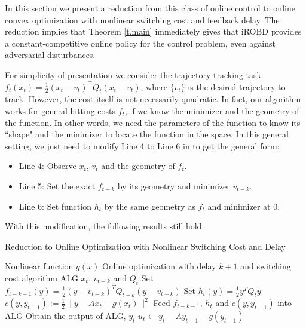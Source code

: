 In this section we present a reduction from this class of online control to online convex optimization with nonlinear switching cost and feedback delay. The reduction implies that Theorem \ref{t.main} immediately gives that iROBD provides a constant-competitive online policy for the control problem, even against adversarial disturbances. 

\begin{remark}
    For simplicity of presentation we consider the trajectory tracking task $f_t(x_t)=\frac{1}{2}(x_t-v_t)^\top Q_t(x_t-v_t)$, where $\{v_t\}$ is the desired trajectory to track. However, the cost itself is not necessarily quadratic.  In fact, our algorithm works for general hitting costs $f_t$, if we know the minimizer and the geometry of the function. In other words, we need the parameters of the function to know its ``shape" and the minimizer to locate the function in the space. In this general setting, we just need to modify Line 4 to Line 6 in  to get the general form:
\begin{itemize}
    \item Line 4: Observe $x_t$, $v_t$ and the geometry of $f_t$. 
    \item Line 5: Set the exact $f_{t-k}$ by its geometry and minimizer $v_{t-k}$.
    \item Line 6: Set function $h_t$ by the same geometry as $f_t$ and minimizer at 0.
\end{itemize}
With this modification, the following results still hold.
\end{remark}

\begin{algorithm}[t!]
   \caption{Reduction to Online Optimization with Nonlinear Switching Cost and Delay}
   \label{a.reduction-2}
\begin{algorithmic}[1]
    Nonlinear function $g(x)$
    Online optimization with delay $k+1$ and switching cost algorithm ALG
         $x_t$, $v_{t-k}$ and $Q_t$
        \STATE Set $f_{t-k-1}(y)=\frac{1}{2}(y-v_{t-k})^TQ_{t-k}(y-v_{t-k})$
        \STATE Set $h_t(y)=\frac{1}{2}y^TQ_ty$
        \STATE $c(y,y_{t-1}):=\frac{1}{2}\|y-Ax_t-g(x_t)\|^2$
        \STATE Feed $f_{t-k-1}$, $h_t$ and $c(y,y_{t-1})$ into ALG
        \STATE Obtain the output of ALG, $y_t$
        \STATE $u_t\leftarrow y_t-Ay_{t-1}-g(y_{t-1})$
   \ENDFOR
\end{algorithmic}
\end{algorithm}

